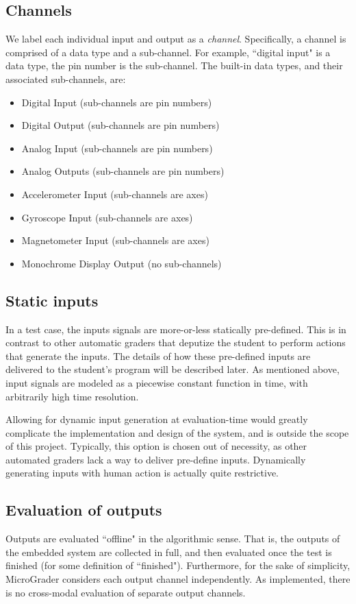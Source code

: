 \documentclass[12pt]{article}
\begin{document}
\subsection{Channels}
\indent \indent We label each individual input and output as a \textit{channel}.  Specifically, a channel is comprised of a data type and a sub-channel.  For example, ``digital input" is a data type, the pin number is the sub-channel.  The built-in data types, and their associated sub-channels, are:

\begin{itemize}
\item Digital Input (sub-channels are pin numbers)
\item Digital Output (sub-channels are pin numbers)
\item Analog Input (sub-channels are pin numbers)
\item Analog Outputs (sub-channels are pin numbers)
\item Accelerometer Input (sub-channels are axes)
\item Gyroscope Input (sub-channels are axes)
\item Magnetometer Input (sub-channels are axes)
\item Monochrome Display Output (no sub-channels)
\end{itemize}

\subsection{Static inputs}
\indent \indent In a test case, the inputs signals are more-or-less statically pre-defined.  This is in contrast to other automatic graders that deputize the student to perform actions that generate the inputs.  The details of how these pre-defined inputs are delivered to the student's program will be described later.  As mentioned above, input signals are modeled as a piecewise constant function in time, with arbitrarily high time resolution.

Allowing for dynamic input generation at evaluation-time would greatly complicate the implementation and design of the system, and is outside the scope of this project.  Typically, this option is chosen out of necessity, as other automated graders lack a way to deliver pre-define inputs.  Dynamically generating inputs with human action is actually quite restrictive.

\subsection{Evaluation of outputs}
\indent \indent Outputs are evaluated ``offline" in the algorithmic sense.  That is, the outputs of the embedded system are collected in full, and then evaluated once the test is finished (for some definition of ``finished").  Furthermore, for the sake of simplicity, MicroGrader considers each output channel independently.  As implemented, there is no cross-modal evaluation of separate output channels.
\end{document}

